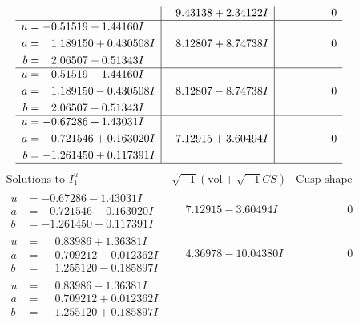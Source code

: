 \documentclass[1p]{elsarticle_modified}
\theoremstyle{definition}
\newcommand{\I}{\sqrt{-1}}
\begin{document}
$$\begin{array}{c|c|c}
 & \phantom{-}9.43138 + 2.34122 I & \phantom{-0.000000 } 0 \\ \hline\begin{aligned}
u &= -0.51519 + 1.44160 I \\
a &= \phantom{-}1.189150 + 0.430508 I \\
b &= \phantom{-}2.06507 + 0.51343 I\end{aligned}
 & \phantom{-}8.12807 + 8.74738 I & \phantom{-0.000000 } 0 \\ \hline\begin{aligned}
u &= -0.51519 - 1.44160 I \\
a &= \phantom{-}1.189150 - 0.430508 I \\
b &= \phantom{-}2.06507 - 0.51343 I\end{aligned}
 & \phantom{-}8.12807 - 8.74738 I & \phantom{-0.000000 } 0 \\ \hline\begin{aligned}
u &= -0.67286 + 1.43031 I \\
a &= -0.721546 + 0.163020 I \\
b &= -1.261450 + 0.117391 I\end{aligned}
 & \phantom{-}7.12915 + 3.60494 I & \phantom{-0.000000 } 0\\
 \hline 
 \end{array}$$\newpage$$\begin{array}{c|c|c}  
\text{Solutions to }I^u_{1}& \I (\text{vol} + \sqrt{-1}CS) & \text{Cusp shape}\\
 \hline 
\begin{aligned}
u &= -0.67286 - 1.43031 I \\
a &= -0.721546 - 0.163020 I \\
b &= -1.261450 - 0.117391 I\end{aligned}
 & \phantom{-}7.12915 - 3.60494 I & \phantom{-0.000000 } 0 \\ \hline\begin{aligned}
u &= \phantom{-}0.83986 + 1.36381 I \\
a &= \phantom{-}0.709212 - 0.012362 I \\
b &= \phantom{-}1.255120 - 0.185897 I\end{aligned}
 & \phantom{-}4.36978 - 10.04380 I & \phantom{-0.000000 } 0 \\ \hline\begin{aligned}
u &= \phantom{-}0.83986 - 1.36381 I \\
a &= \phantom{-}0.709212 + 0.012362 I \\
b &= \phantom{-}1.255120 + 0.185897 I\end{aligned}

\end{array}$$
\end{document}
